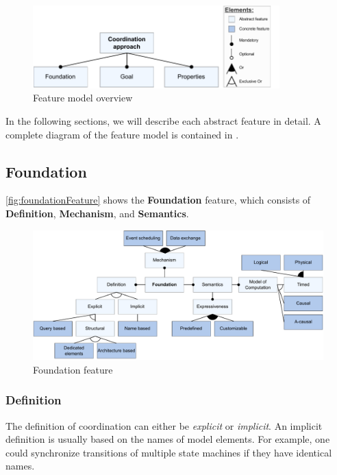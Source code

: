 \documentclass[runningheads]{llncs}
\begin{document}
\begin{figure}[ht]
	\centering
	\includegraphics[width=0.85\textwidth]{images/root}
	\caption{Feature model overview}
	\label{fig:featureModelOverview}
\end{figure}

In the following sections, we will describe each abstract feature in detail.
A complete diagram of the feature model is contained in \cite{timkrauterArtifactsCoordination2024}.

\subsection{Foundation}

\autoref{fig:foundationFeature} shows the \textbf {Foundation} feature, which consists of \textbf{Definition}, \textbf{Mechanism}, and \textbf{Semantics}.

\begin{figure}[ht]
	\centering
	\includegraphics[width=1\textwidth]{images/coordination_feature}
	\caption{Foundation feature}
	\label{fig:foundationFeature}
\end{figure}

\subsubsection{Definition} The definition of coordination can either be \textit{explicit} or \textit{implicit}.
An implicit definition is usually based on the names of model elements.
For example, one could synchronize transitions of multiple state machines if they have identical names.
\end{document}
